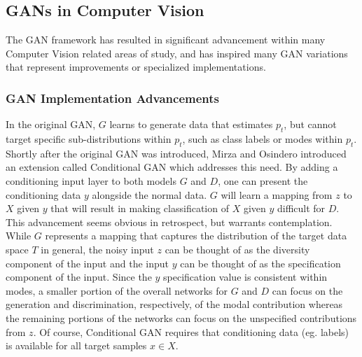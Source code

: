 \documentclass[11pt]{article}
\begin{document}
\subsection{GANs in Computer Vision}

The GAN framework has resulted in significant advancement within many Computer Vision related areas of study, and has inspired many GAN variations that represent improvements or specialized implementations.

\subsubsection{GAN Implementation Advancements}

In the original GAN, $G$ learns to generate data that estimates $p_t$, but cannot target specific sub-distributions within $p_t$, such as class labels or modes within $p_t$.  Shortly after the original GAN was introduced, Mirza and Osindero introduced an extension called Conditional GAN \cite{mirza2014conditional} which addresses this need.  By adding a conditioning input layer to both models $G$ and $D$, one can present the conditioning data $y$ alongside the normal data.  $G$ will learn a mapping from $z$ to $X$ given $y$ that will result in making classification of $X$ given $y$ difficult for $D$.  This advancement seems obvious in retrospect, but warrants contemplation.  While $G$ represents a mapping that captures the distribution of the target data space $T$ in general, the noisy input $z$ can be thought of as the diversity component of the input and the input $y$ can be thought of as the specification component of the input.  Since the $y$ specification value is consistent within modes, a smaller portion of the overall networks for $G$ and $D$ can focus on the generation and discrimination, respectively, of the modal contribution whereas the remaining portions of the networks can focus on the unspecified contributions from $z$.  Of course, Conditional GAN requires that conditioning data (eg. labels) is available for all target samples $x \in X$.

\end{document}
